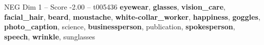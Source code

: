 \begin{textsample}{NEG Dim 1 – Score -2.00 – t005436}  \label{ex:f1_neg_008}
\textbf{eyewear}, \textbf{glasses}, \textbf{vision\_care}, \textbf{facial\_hair}, \textbf{beard}, \textbf{moustache}, \textbf{white-collar\_worker}, \textbf{happiness}, \textbf{goggles}, \textbf{photo\_caption}, science, \textbf{businessperson}, publication, \textbf{spokesperson}, \textbf{speech}, \textbf{wrinkle}, sunglasses

\end{textsample}
